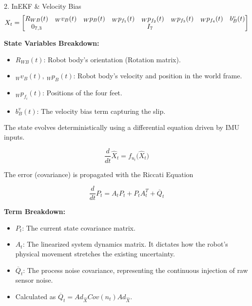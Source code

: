 \documentclass[aspectratio=169, 9pt]{beamer}
\begin{document}
\begin{frame}[t]{2. InEKF \& Velocity Bias}
    \begin{equation}
        X_t = 
        \begin{bmatrix} 
        R_{WB}(t) & {}_Wv_B(t) & {}_Wp_B(t) & {}_Wp_{f_1}(t) & {}_Wp_{f_2}(t) & {}_Wp_{f_3}(t) & {}_Wp_{f_4}(t) & b_B^v(t) \\ 
        0_{7,3} & \multicolumn{7}{c}{I_7} 
        \end{bmatrix}
    \end{equation}

    {\tiny
    \textbf{State Variables Breakdown:}
    \begin{itemize}
        \item $R_{WB}(t)$: Robot body's orientation (Rotation matrix).
        \item ${}_Wv_B(t), \ {}_Wp_B(t)$: Robot body's velocity and position in the world frame.
        \item ${}_Wp_{f_i}(t)$: Positions of the four feet.
        \item $b_B^v(t)$: The velocity bias term capturing the slip.
    \end{itemize}
    }

    The state evolves deterministically using a differential equation driven by IMU inputs.

    \begin{equation}
        \frac{d}{dt}\hat{X}_t = f_{u_t}\big(\hat{X}_t\big)
    \end{equation}

    The error (covariance) is propagated with the Riccati Equation

    \begin{equation}
        \frac{d}{dt}P_{t} = A_{t}P_{t} + P_{t}A_{t}^{T} + \overline{Q}_{t}
    \end{equation}
    \vspace{0.2cm}

    {\tiny
        \textbf{Term Breakdown:}
        \begin{itemize}
            \item $P_{t}$: The current state covariance matrix.
            \item $A_{t}$: The linearized system dynamics matrix. It dictates how the robot's physical movement stretches the existing uncertainty.
            \item $\overline{Q}_{t}$: The process noise covariance, representing the continuous injection of raw sensor noise.
                \item Calculated as $\overline{Q}_{t} = Ad_{\hat{X}}Cov(n_{t})Ad_{\hat{X}}$.
        \end{itemize}
    }
\end{frame}
\end{document}
